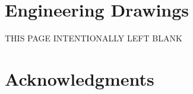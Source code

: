 \documentclass[report]{sac}
\newif\ifwip
\newcommand\putdescription[1]
{
	\ifwip
		\begingroup
		\small\em
		#1
		\endgroup
	\fi
}
\newcommand\pageleftblank
{
	\begin{center}
		\large
		THIS PAGE INTENTIONALLY LEFT BLANK
	\end{center}
}
\begin{document}
    \pagebreak
	\section{Engineering Drawings} \label{drawings}
	\putdescription{\DrawingsDescription}
    \pageleftblank
    
    
	\pagebreak
	\section*{Acknowledgments}
	\putdescription{\AcknowledgementsDescription}

	

	
\end{document}
